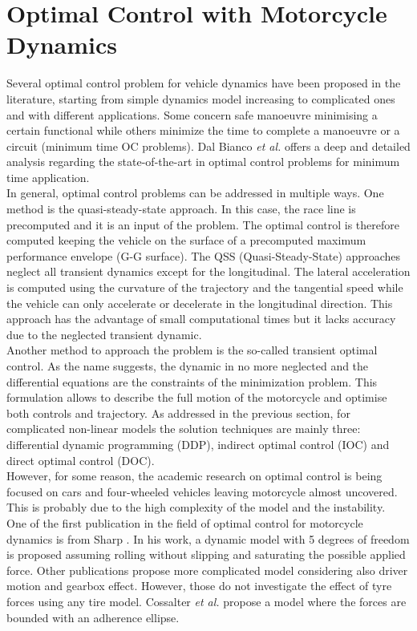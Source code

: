 \section{Optimal Control with Motorcycle Dynamics}
\label{chapter1_2}
%
Several optimal control problem for vehicle dynamics have been proposed in the literature, starting from simple dynamics model increasing to complicated ones and with different applications. Some concern safe manoeuvre minimising a certain functional while others minimize the time to complete a manoeuvre or a circuit (minimum time OC problems). Dal Bianco \textit{et al.}\cite{dal2019comparison} offers a deep and detailed analysis regarding the state-of-the-art in optimal control problems for minimum time application.\\
In general, optimal control problems can be addressed in multiple ways. One method is the quasi-steady-state approach. In this case, the race line is precomputed and it is an input of the problem. The optimal control is therefore computed keeping the vehicle on the surface of a precomputed maximum performance envelope (G-G surface). The QSS (Quasi-Steady-State) approaches neglect all transient dynamics except for the longitudinal. The lateral acceleration is computed using the curvature of the trajectory and the tangential speed while the vehicle can only accelerate or decelerate in the longitudinal direction. This approach has the advantage of small computational times but it lacks accuracy due to the neglected transient dynamic.\\
Another method to approach the problem is the so-called transient optimal control. As the name suggests, the dynamic in no more neglected and the differential equations are the constraints of the minimization problem. This formulation allows to describe the full motion of the motorcycle and optimise both controls and trajectory. As addressed in the previous section, for complicated non-linear models the solution techniques are mainly three: differential dynamic programming (DDP), indirect optimal control (IOC) and direct optimal control (DOC).\\
However, for some reason, the academic research on optimal control is being focused on cars and four-wheeled vehicles leaving motorcycle almost uncovered. This is probably due to the high complexity of the model and the instability.\\
One of the first publication in the field of optimal control for motorcycle dynamics is from Sharp \cite{sharp2014method}. In his work, a dynamic model with 5 degrees of freedom is proposed assuming rolling without slipping and saturating the possible applied force. Other publications propose more complicated model considering also driver motion and gearbox effect\cite{cossalter2010investigation,lot2008advanced,simon2008application}. However, those do not investigate the effect of tyre forces using any tire model. Cossalter \textit{et al.}\cite{cossalter2010investigation} propose a model where the forces are bounded with an adherence ellipse.\\
